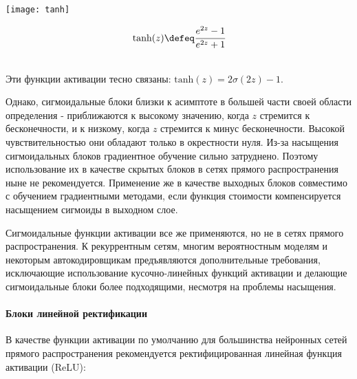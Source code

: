 \begin{minipage}{0.4\textwidth}
    \texttt{[image: tanh]}
    \label{fig:tanh}
\end{minipage}
\hspace{30pt}
\begin{minipage}{0.3\textwidth}
    \begin{equation*}
        \text{tanh}(z) \defeq \cfrac{e^{2z} - 1}{e^{2z} + 1}
    \end{equation*}
\end{minipage}\\

Эти функции активации тесно связаны: $\text{tanh}(z) = 2 \sigma(2z) - 1$.

Однако, сигмоидальные блоки близки к асимптоте в большей части своей области определения -
приближаются к высокому значению, когда $z$ стремится к бесконечности, и к низкому,
когда $z$ стремится к минус бесконечности. Высокой чувствительностью они обладают 
только в окрестности нуля. Из-за насыщения сигмоидальных блоков градиентное
обучение сильно затруднено. Поэтому использование их в качестве скрытых блоков
в сетях прямого распространения ныне не рекомендуется. Применение же в качестве
выходных блоков совместимо с обучением градиентными методами, если функция
стоимости компенсируется насыщением сигмоиды в выходном слое.

Сигмоидальные функции активации все же применяются, но не в сетях прямого
распространения. К рекуррентным сетям, многим вероятностным моделям и некоторым 
автокодировщикам предъявляются дополнительные требования, исключающие
использование кусочно-линейных функций активации и делающие сигмоидальные
блоки более подходящими, несмотря на проблемы насыщения.

\paragraph{Блоки линейной ректификации}

В качестве функции активации по умолчанию для большинства нейронных сетей прямого 
распространения рекомендуется ректифицированная линейная функция активации (ReLU):

